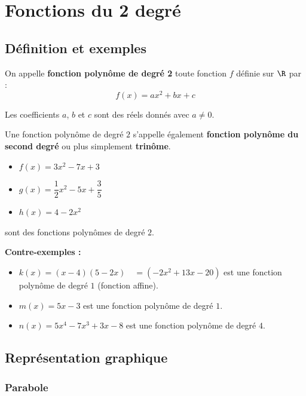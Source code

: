\chapter{Fonctions du 2 degré}

\section{Définition et exemples}

\begin{definition}
	On appelle \textbf{fonction polynôme de degré 2} toute fonction $f$ définie sur $\R$ par :
	\[
		f(x)=ax^{2}+bx+c
	\]

	Les coefficients $a$, $b$ et $c$ sont des réels donnés avec $a \neq 0$.
\end{definition}

\begin{rem}
	Une fonction polynôme de degré $2$ s'appelle également \textbf{fonction polynôme du second degré} ou plus simplement \textbf{trinôme}.
\end{rem}

\begin{ex}
	\nline
	\begin{itemize}
		\item $f(x)=3x^{2}-7x+3$
		\item $g(x)=\dfrac{1}{2}x^{2}-5x+\dfrac{3}{5}$
		\item $h(x)=4-2x^{2}$
	\end{itemize}
	sont des fonctions polynômes de degré $2$.

	\textbf{Contre-exemples :}

	\begin{itemize}
		\item $k(x)=(x-4)(5-2x)\quad =(-2x^{2}+13x-20)$ est une fonction polynôme de degré $1$ (fonction affine).
		\item $m(x)=5x-3$ est une fonction polynôme de degré $1$.
		\item $n(x)=5x^{4}-7x^{3}+3x-8$ est une fonction polynôme de degré $4$.
	\end{itemize}
\end{ex}

\section{Représentation graphique}

\subsection{Parabole}

